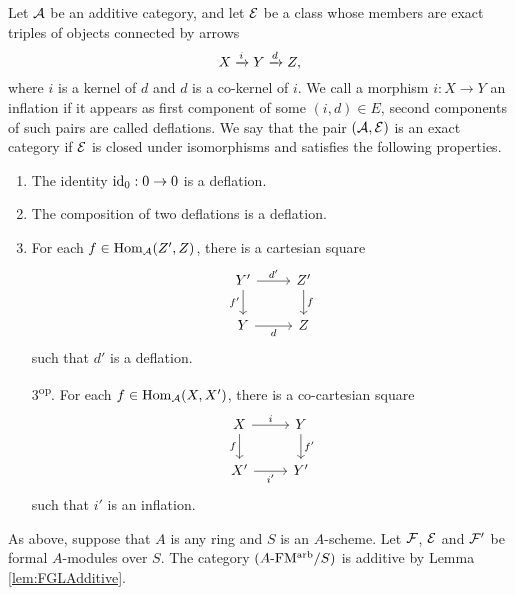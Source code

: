 \documentclass[../main.tex]{subfiles}
\begin{document}
\begin{defi}
  Let $\mathcal{A}$ be an additive category, and let $\mathcal{E}$ be a class whose
  members are exact triples of objects connected by arrows 
  \begin{equation*}
    X \xrightarrow{i} Y \xrightarrow{d} Z,
  \end{equation*}
  where $i$ is a kernel of $d$ and $d$ is a co-kernel of $i$. 
  We call a morphism $i:X \to Y$ an inflation if it appears as first component
  of some $(i,d) \in E$, second components of such pairs are called deflations.
  We say that the pair $(\mathcal{A}, \mathcal{E})$ is an exact category if 
  $\mathcal{E}$ is closed under isomorphisms and satisfies the following properties.
  \begin{enumerate}
    \item The identity $\operatorname{id}_0: 0 \to 0$ is a deflation.
    \item The composition of two deflations is a deflation.
    \item For each $f \in \operatorname{Hom}_{\mathcal{A}}(Z', Z)$, there is a cartesian square
    \begin{equation*}
        \begin{tikzcd}[ampersand replacement=\&]
        	{Y'} \& {Z'} \\
        	Y \& Z
        	\arrow["{d'}", from=1-1, to=1-2]
        	\arrow["{f'}"', from=1-1, to=2-1]
        	\arrow["f", from=1-2, to=2-2]
        	\arrow["d"', from=2-1, to=2-2]
        \end{tikzcd}
    \end{equation*}
    such that $d'$ is a deflation.
  \item[3\textsuperscript{op}.] For each $f \in \operatorname{Hom}_{\mathcal{A}}(X, X')$, there is a
    co-cartesian square
      \begin{equation*}
        \begin{tikzcd}[ampersand replacement=\&]
        	X \& Y \\
        	{X'} \& {Y'}
        	\arrow["i", from=1-1, to=1-2]
        	\arrow["f"', from=1-1, to=2-1]
        	\arrow["{f'}", from=1-2, to=2-2]
        	\arrow["{i'}"', from=2-1, to=2-2]
        \end{tikzcd}
      \end{equation*}
      such that $i'$ is an inflation.
  \end{enumerate}
\end{defi}

As above, suppose that $A$ is any ring and $S$ is an $A$-scheme. Let $\mathcal{F}$, $\mathcal{E}$ and $\mathcal{F}'$ be formal $A$-modules
over $S$. The category ${({A}\text-\allowbreak\mathrm{FM^{arb}}/{S})}$ is additive by Lemma \ref{lem:FGLAdditive}.
\end{document}
